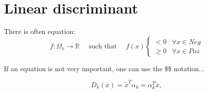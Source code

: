 \documentclass{article}
\begin{document}


\section{Linear discriminant}\label{sec:THEORY:linear}

There is often equation:
\begin{equation}
	f: \Omega_x \rightarrow {\mathbb{R}}
	\quad\text{ such that }
	\quad f(x)
	\begin{cases}
		<0 & \forall x\in Neg \\
		\geq 0 & \forall x\in Poz
	\end{cases}
	\label{eq:diszkr:fugg}
\end{equation}



If an equation is not very important, one can use the \$\$ notation...

$$D_k(x)=\tilde{x}^T\alpha_k=\alpha_k^T\tilde{x},$$














 
\end{document}
